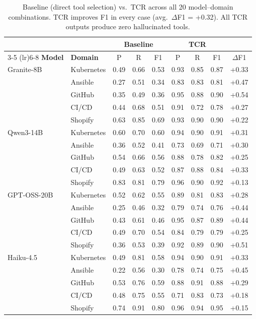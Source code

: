 \begin{table}[t]
\centering
\small
\begin{tabular}{ll ccc ccc c}
\toprule
& & \multicolumn{3}{c}{\textbf{Baseline}} & \multicolumn{3}{c}{\textbf{TCR}} & \\
\cmidrule(lr){3-5} \cmidrule(lr){6-8}
\textbf{Model} & \textbf{Domain} & P & R & F1 & P & R & F1 & $\Delta$F1 \\
\midrule
Granite-8B & Kubernetes & 0.49 & 0.66 & 0.53 & 0.93 & 0.85 & 0.87 & +0.33 \\
 & Ansible & 0.27 & 0.51 & 0.34 & 0.83 & 0.83 & 0.81 & +0.47 \\
 & GitHub & 0.35 & 0.49 & 0.36 & 0.95 & 0.88 & 0.90 & +0.54 \\
 & CI/CD & 0.44 & 0.68 & 0.51 & 0.91 & 0.72 & 0.78 & +0.27 \\
 & Shopify & 0.63 & 0.85 & 0.69 & 0.93 & 0.90 & 0.90 & +0.22 \\
\midrule
Qwen3-14B & Kubernetes & 0.60 & 0.70 & 0.60 & 0.94 & 0.90 & 0.91 & +0.31 \\
 & Ansible & 0.36 & 0.52 & 0.41 & 0.73 & 0.69 & 0.71 & +0.30 \\
 & GitHub & 0.54 & 0.66 & 0.56 & 0.88 & 0.78 & 0.82 & +0.25 \\
 & CI/CD & 0.49 & 0.63 & 0.52 & 0.87 & 0.88 & 0.84 & +0.33 \\
 & Shopify & 0.83 & 0.81 & 0.79 & 0.96 & 0.90 & 0.92 & +0.13 \\
\midrule
GPT-OSS-20B & Kubernetes & 0.52 & 0.62 & 0.55 & 0.89 & 0.81 & 0.83 & +0.28 \\
 & Ansible & 0.25 & 0.46 & 0.32 & 0.79 & 0.74 & 0.76 & +0.44 \\
 & GitHub & 0.43 & 0.61 & 0.46 & 0.95 & 0.87 & 0.89 & +0.44 \\
 & CI/CD & 0.49 & 0.70 & 0.54 & 0.84 & 0.79 & 0.79 & +0.25 \\
 & Shopify & 0.36 & 0.53 & 0.39 & 0.92 & 0.89 & 0.90 & +0.51 \\
\midrule
Haiku-4.5 & Kubernetes & 0.49 & 0.81 & 0.58 & 0.94 & 0.90 & 0.91 & +0.33 \\
 & Ansible & 0.22 & 0.56 & 0.30 & 0.78 & 0.74 & 0.75 & +0.45 \\
 & GitHub & 0.53 & 0.76 & 0.59 & 0.88 & 0.91 & 0.88 & +0.29 \\
 & CI/CD & 0.48 & 0.75 & 0.55 & 0.71 & 0.83 & 0.73 & +0.18 \\
 & Shopify & 0.74 & 0.91 & 0.80 & 0.96 & 0.94 & 0.95 & +0.15 \\
\bottomrule
\end{tabular}
\caption{Baseline (direct tool selection) vs.\ TCR across all 20 model--domain combinations. TCR improves F1 in every case (avg.\ $\Delta$F1 = +0.32). All TCR outputs produce zero hallucinated tools.}
\label{tab:main-results}
\end{table}

